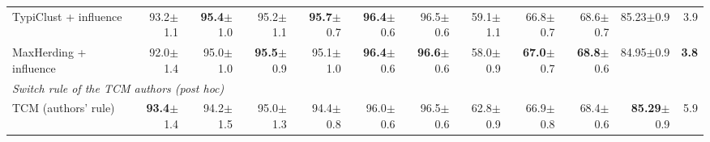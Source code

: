 \begin{table}[t]
\begin{adjustbox}{max width=\textwidth}
\begin{tabular}{lrrrrrrrrrrr}
\quad TypiClust + influence & 93.2{\scriptsize$\pm$1.1} & \textbf{95.4}{\scriptsize$\pm$1.0} & 95.2{\scriptsize$\pm$1.1} & \textbf{95.7}{\scriptsize$\pm$0.7} & \textbf{96.4}{\scriptsize$\pm$0.6} & 96.5{\scriptsize$\pm$0.6} & 59.1{\scriptsize$\pm$1.1} & 66.8{\scriptsize$\pm$0.7} & 68.6{\scriptsize$\pm$0.7} & 85.23{\scriptsize$\pm$0.9} & 3.9 \\
\quad MaxHerding + influence & 92.0{\scriptsize$\pm$1.4} & 95.0{\scriptsize$\pm$1.0} & \textbf{95.5}{\scriptsize$\pm$0.9} & 95.1{\scriptsize$\pm$1.0} & \textbf{96.4}{\scriptsize$\pm$0.6} & \textbf{96.6}{\scriptsize$\pm$0.6} & 58.0{\scriptsize$\pm$0.9} & \textbf{67.0}{\scriptsize$\pm$0.7} & \textbf{68.8}{\scriptsize$\pm$0.6} & 84.95{\scriptsize$\pm$0.9} & \textbf{3.8} \\
\multicolumn{12}{l}{\textit{Switch rule of the TCM authors (post hoc)}} \\
\quad TCM (authors' rule)~\cite{doucet2024bridging} & \textbf{93.4}{\scriptsize$\pm$1.4} & 94.2{\scriptsize$\pm$1.5} & 95.0{\scriptsize$\pm$1.3} & 94.4{\scriptsize$\pm$0.8} & 96.0{\scriptsize$\pm$0.6} & 96.5{\scriptsize$\pm$0.6} & 62.8{\scriptsize$\pm$0.9} & 66.9{\scriptsize$\pm$0.8} & 68.4{\scriptsize$\pm$0.6} & \textbf{85.29}{\scriptsize$\pm$0.9} & 5.9 \\
\bottomrule
\end{tabular}
\end{adjustbox}
\end{table}
